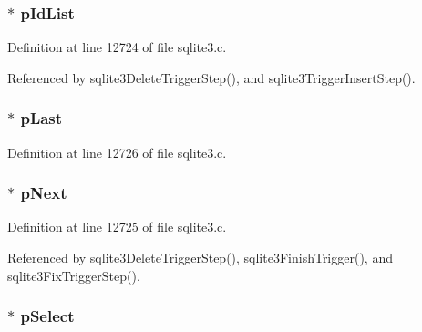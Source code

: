 \subsubsection[{p\+Id\+List}]{$\ast$ p\+Id\+List}\label{struct_trigger_step_a2a5b925a55a70856d6818870b53bd74a}


Definition at line 12724 of file sqlite3.\+c.



Referenced by sqlite3\+Delete\+Trigger\+Step(), and sqlite3\+Trigger\+Insert\+Step().

\hypertarget{struct_trigger_step_ac3ac638348976d194b8e3efe5111a5c1}{}
\subsubsection[{p\+Last}]{$\ast$ p\+Last}\label{struct_trigger_step_ac3ac638348976d194b8e3efe5111a5c1}


Definition at line 12726 of file sqlite3.\+c.

\hypertarget{struct_trigger_step_a0ad177537f1a6794a0ef4bc0f8a8609a}{}
\subsubsection[{p\+Next}]{$\ast$ p\+Next}\label{struct_trigger_step_a0ad177537f1a6794a0ef4bc0f8a8609a}


Definition at line 12725 of file sqlite3.\+c.



Referenced by sqlite3\+Delete\+Trigger\+Step(), sqlite3\+Finish\+Trigger(), and sqlite3\+Fix\+Trigger\+Step().

\hypertarget{struct_trigger_step_ab0e0ccc47de126415a7ad889ff1d228a}{}
\subsubsection[{p\+Select}]{$\ast$ p\+Select}\label{struct_trigger_step_ab0e0ccc47de126415a7ad889ff1d228a}



